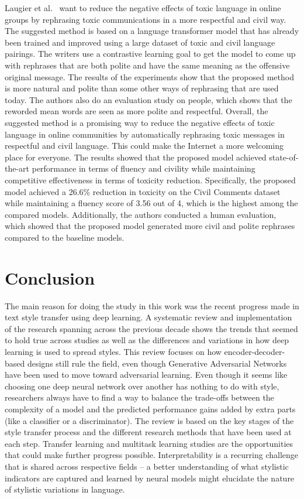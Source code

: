 \documentclass[akbc,twoside,11pt]{article}
\begin{document}
Laugier et al.~\cite{laugier2021civil} want to reduce the negative effects of toxic language in online groups by rephrasing toxic communications in a more respectful and civil way. The suggested method is based on a language transformer model that has already been trained and improved using a large dataset of toxic and civil language pairings. The writers use a contrastive learning goal to get the model to come up with rephrases that are both polite and have the same meaning as the offensive original message. The results of the experiments show that the proposed method is more natural and polite than some other ways of rephrasing that are used today. The authors also do an evaluation study on people, which shows that the reworded mean words are seen as more polite and respectful. Overall, the suggested method is a promising way to reduce the negative effects of toxic language in online communities by automatically rephrasing toxic messages in respectful and civil language. This could make the Internet a more welcoming place for everyone. The results showed that the proposed model achieved state-of-the-art performance in terms of fluency and civility while maintaining competitive effectiveness in terms of toxicity reduction. Specifically, the proposed model achieved a 26.6\% reduction in toxicity on the Civil Comments dataset while maintaining a fluency score of 3.56 out of 4, which is the highest among the compared models. Additionally, the authors conducted a human evaluation, which showed that the proposed model generated more civil and polite rephrases compared to the baseline models.

\section{Conclusion}
\label{sec:conclusion}

The main reason for doing the study in this work was the recent progress made in text style transfer using deep learning. A systematic review and implementation of the research spanning across the previous decade shows the trends that seemed to hold true across studies as well as the differences and variations in how deep learning is used to spread styles. This review focuses on how encoder-decoder-based designs still rule the field, even though Generative Adversarial Networks have been used to move toward adversarial learning. Even though it seems like choosing one deep neural network over another has nothing to do with style, researchers always have to find a way to balance the trade-offs between the complexity of a model and the predicted performance gains added by extra parts (like a classifier or a discriminator). The review is based on the key stages of the style transfer process and the different research methods that have been used at each step. Transfer learning and multitask learning studies are the opportunities that could make further progress possible. Interpretability is a recurring challenge that is shared across respective fields – a better understanding of what stylistic indicators are captured and learned by neural models might elucidate the nature of stylistic
variations in language.
\end{document}
